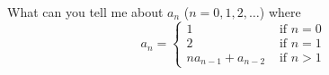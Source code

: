 What can you tell me about $a_n$ ($n=0, 1, 2, \ldots$) where
\[
a_n = 
\begin{cases}
1 &\text{ if } n = 0 \\
2 &\text{ if } n = 1 \\
na_{n-1} + a_{n-2} & \text{ if } n > 1
\end{cases}
\]
